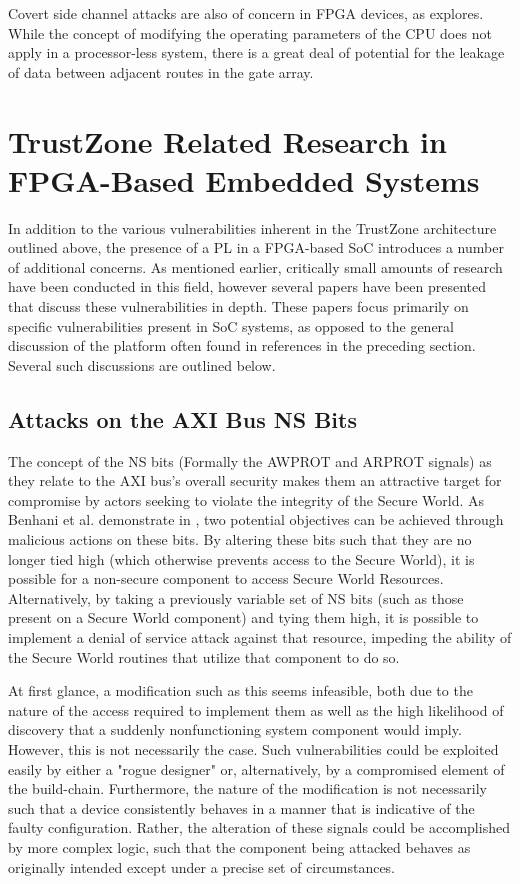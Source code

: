 \documentclass[journal]{IEEEtran}
\begin{document}
Covert side channel attacks are also of concern in FPGA devices, as 
\cite{giechaskiel_leaky_2018} explores. While the concept of modifying the operating
parameters of the CPU does not apply in a processor-less system, there is a great deal of
potential for the leakage of data between adjacent routes in the gate array.

\section{TrustZone Related Research in FPGA-Based Embedded Systems}
In addition to the various vulnerabilities inherent in the TrustZone architecture outlined
above, the presence of a PL in a FPGA-based SoC introduces a number of
additional concerns. As mentioned earlier, critically small amounts of research
have been conducted in this field, however several papers have been presented that discuss
these vulnerabilities in depth. These papers focus primarily on specific vulnerabilities
present in SoC systems, as opposed to the general discussion of the platform often found
in references in the preceding section. Several such discussions are outlined below.

\subsection{Attacks on the AXI Bus NS Bits}
The concept of the NS bits (Formally the AWPROT and ARPROT signals) as they relate to the
AXI bus's overall security makes them an attractive target for compromise by actors 
seeking to violate the integrity of the Secure World. As Benhani et al. demonstrate in 
\cite{benhani_security_2019}, two potential objectives can be achieved through malicious 
actions on these bits. By altering these bits such that they are no longer tied high 
(which otherwise prevents access to the Secure World), it is possible for a non-secure 
component to access Secure World Resources. Alternatively, by taking a previously variable
set of NS bits (such as those present on a Secure World component) and tying them high, it
is possible to implement a denial of service attack against that resource, impeding the 
ability of the Secure World routines that utilize that component to do so.

At first glance, a modification such as this seems infeasible, both due to the nature of
the access required to implement them as well as the high likelihood of discovery that a
suddenly nonfunctioning system component would imply. However, this is not necessarily the
case. Such vulnerabilities could be exploited easily by either a "rogue designer" or,
alternatively, by a compromised element of the build-chain. Furthermore, the nature of the
modification is not necessarily such that a device consistently behaves in a manner that is
indicative of the faulty configuration. Rather, the alteration of these signals could be
accomplished by more complex logic, such that the component being attacked behaves as
originally intended except under a precise set of circumstances.
\end{document}
